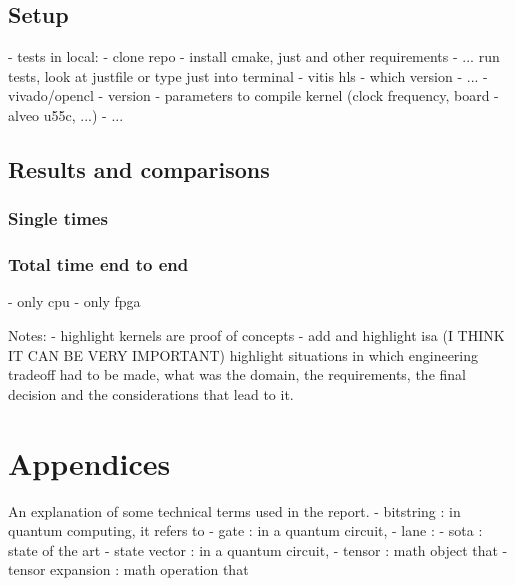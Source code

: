 \documentclass[12pt,oneside,a4paper]{article}
\begin{document}
\subsection{Setup}
- tests in local:
	- clone repo
	- install cmake, just and other requirements
	- ... run tests, look at justfile or type just into terminal
- vitis hls
	- which version
	- ...
- vivado/opencl
	- version
	- parameters to compile kernel (clock frequency, board - alveo u55c, ...)
	- ...

\subsection{Results and comparisons}

\subsubsection{Single times}
\subsubsection{Total time end to end}
	- only cpu
	- only fpga

Notes:
	- highlight kernels are proof of concepts
	- add and highlight isa
	(I THINK IT CAN BE VERY IMPORTANT) highlight situations in which engineering tradeoff had to be made, what was the domain, the requirements, the final decision and the considerations that lead to it.






\printbibliography[title={\section{References}}]

\section{Appendices}
An explanation of some technical terms used in the report.
- bitstring : in quantum computing, it refers to
- gate : in a quantum circuit,
- lane :
- sota : state of the art
- state vector : in a quantum circuit,
- tensor : math object that
- tensor expansion : math operation that
\end{document}
